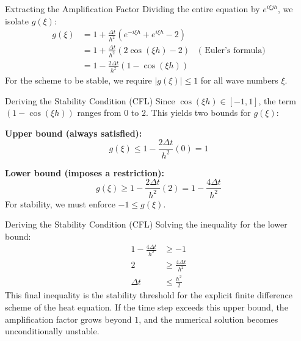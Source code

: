 \documentclass[aspectratio=169]{beamer}
\begin{document}
\begin{frame}{Extracting the Amplification Factor}
    Dividing the entire equation by $e^{i\xi j h}$, we isolate $g(\xi)$:
    \begin{align*}
        g(\xi) &= 1 + \frac{\Delta t}{h^2}(e^{-i\xi h} + e^{i\xi h} - 2)  \\
               &= 1 + \frac{\Delta t}{h^2}(2\cos(\xi h) - 2) \quad \text{( Euler's formula)}  \\
               &= 1 - \frac{2\Delta t}{h^2}(1 - \cos(\xi h)) 
    \end{align*}
    For the scheme to be stable, we require $|g(\xi)| \le 1$ for all wave numbers $\xi$.
\end{frame}

\begin{frame}{Deriving the Stability Condition (CFL)}
    Since $\cos(\xi h) \in [-1, 1]$, the term $(1 - \cos(\xi h))$ ranges from $0$ to $2$. This yields two bounds for $g(\xi)$:
    
    \vspace{0.3cm}
    \textbf{Upper bound (always satisfied):}
    \[
        g(\xi) \le 1 - \frac{2\Delta t}{h^2}(0) = 1 
    \]
    
    \textbf{Lower bound (imposes a restriction):}
    \[
        g(\xi) \ge 1 - \frac{2\Delta t}{h^2}(2) = 1 - \frac{4\Delta t}{h^2} 
    \]
    For stability, we must enforce $-1 \le g(\xi)$.
\end{frame}

\begin{frame}{Deriving the Stability Condition (CFL)}
    Solving the inequality for the lower bound:
    \begin{align*}
        1 - \frac{4\Delta t}{h^2} &\ge -1  \\
        2 &\ge \frac{4\Delta t}{h^2}  \\
        \Delta t &\le \frac{h^2}{2} 
    \end{align*}
    This final inequality is the stability threshold for the explicit finite difference scheme of the heat equation. If the time step exceeds this upper bound, the amplification factor grows beyond $1$, and the numerical solution becomes unconditionally unstable.
\end{frame}
\end{document}
